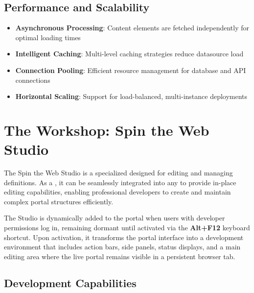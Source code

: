 \subsection{Performance and Scalability}

\begin{itemize}
	\item \textbf{Asynchronous Processing}: Content elements are fetched independently for optimal loading times
	\item \textbf{Intelligent Caching}: Multi-level caching strategies reduce datasource load
	\item \textbf{Connection Pooling}: Efficient resource management for database and API connections
	\item \textbf{Horizontal Scaling}: Support for load-balanced, multi-instance deployments
\end{itemize}

\section{The Workshop: Spin the Web Studio}
\label{sec:workshop-studio}

The Spin the Web Studio is a specialized \webbaselet{} designed for editing and managing \webbase{} definitions. As a \webbaselet{}, it can be seamlessly integrated into any \webbase{} to provide in-place editing capabilities, enabling professional developers to create and maintain complex portal structures efficiently.

The Studio is dynamically added to the portal \webbase{} when users with developer permissions log in, remaining dormant until activated via the \textbf{Alt+F12} keyboard shortcut. Upon activation, it transforms the portal interface into a development environment that includes action bars, side panels, status displays, and a main editing area where the live portal remains visible in a persistent browser tab.

\subsection{Development Capabilities}

